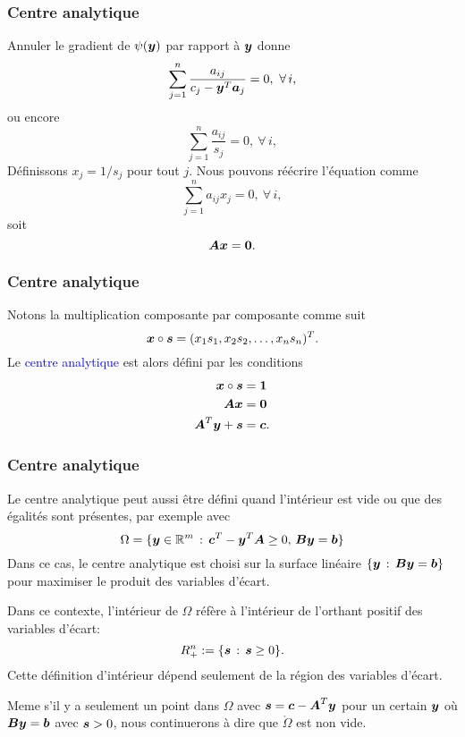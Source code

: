 \documentclass[usepdftitle=false, aspectratio=169]{beamer}
\begin{document}
\begin{frame}
\frametitle{Centre analytique}

Annuler le gradient de $\psi({\boldsymbol{y}})$ par rapport à ${\boldsymbol{y}}$ donne
\[
\sum_{j = 1}^n \frac{a_{ij}}{c_j - {\boldsymbol{y}}^T{\boldsymbol{a}}_j} = 0,\ \forall\, i,
\]
ou encore
\[
\sum_{j = 1}^n \frac{a_{ij}}{s_j} = 0,\ \forall\, i,
\]
Définissons $x_j = 1/s_j$ pour tout $j$. Nous pouvons réécrire l'équation comme
$$
\sum_{j = 1}^n a_{ij}x_j = 0,\ \forall\, i,
$$
soit
$$
{\boldsymbol{A}}{\boldsymbol{x}} = {\boldsymbol{0}}.
$$

\end{frame}

\begin{frame}
\frametitle{Centre analytique}

Notons la multiplication composante par composante comme suit
\[
{\boldsymbol{x}} \circ {\boldsymbol{s}} = (x_1s_1, x_2s_2, \ldots, x_ns_n)^T.
\]
Le \textcolor{blue}{centre analytique} est alors défini par les conditions
\begin{align*}
{\boldsymbol{x}} \circ {\boldsymbol{s}} &= {\boldsymbol{1}} \\
{\boldsymbol{A}}{\boldsymbol{x}} &= {\boldsymbol{0}} \\
{\boldsymbol{A}}^T{\boldsymbol{y}} + {\boldsymbol{s}} & = {\boldsymbol{c}}.
\end{align*}

\end{frame}

\begin{frame}
\frametitle{Centre analytique}

Le centre analytique peut aussi être défini quand l'intérieur est vide ou que des égalités sont présentes, par exemple avec
\[
\Omega = \lbrace {\boldsymbol{y}} \in {\mathbb{R}}^m \,:\, {\boldsymbol{c}}^T-{\boldsymbol{y}}^T{\boldsymbol{A}} \geq 0,\, {\boldsymbol{B}}{\boldsymbol{y}} = {\boldsymbol{b}} \rbrace
\]
Dans ce cas, le centre analytique est choisi sur la surface linéaire $\lbrace {\boldsymbol{y}} \,:\, {\boldsymbol{B}}{\boldsymbol{y}} = {\boldsymbol{b}} \rbrace$ pour maximiser le produit des variables d'écart.

\mbox{}

Dans ce contexte, l'intérieur de $\Omega$ réfère à l'intérieur de l'orthant positif des variables d'écart:
\[
R^n_+ := \lbrace {\boldsymbol{s}} \,:\, {\boldsymbol{s}} \geq 0 \rbrace.
\]
Cette définition d'intérieur dépend seulement de la région des variables d'écart.

\mbox{}

Meme s'il y a seulement un point dans $\Omega$ avec ${\boldsymbol{s}} = {\boldsymbol{c}} - {\boldsymbol{A}}^T{\boldsymbol{y}}$ pour un certain ${\boldsymbol{y}}$ où ${\boldsymbol{B}}{\boldsymbol{y}} = {\boldsymbol{b}}$ avec ${\boldsymbol{s}} > 0$, nous continuerons à dire que $\mathring{\Omega}$ est non vide.

\end{frame}
\end{document}
